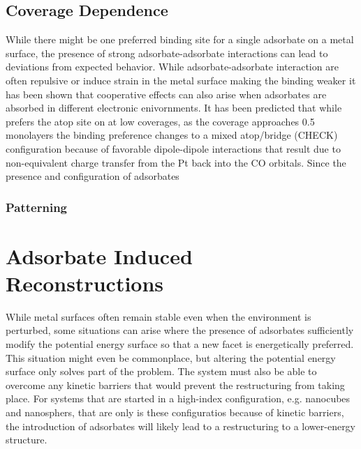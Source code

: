 \subsection{Coverage Dependence}
While there might be one preferred binding site for a single adsorbate on a
metal surface, the presence of strong adsorbate-adsorbate interactions can lead
to deviations from expected behavior. While adsorbate-adsorbate interaction are
often repulsive or induce strain in the metal surface making the binding
weaker\citep{} it has been shown that cooperative effects can also arise when
adsorbates are absorbed in different electronic enivornments. It has been
predicted that while  prefers the atop site on  at low coverages,
as the coverage approaches 0.5 monolayers the binding preference changes to a
mixed atop/bridge (CHECK) configuration because of favorable dipole-dipole
interactions that result due to non-equivalent charge transfer from the Pt back
into the CO orbitals. Since the presence and configuration of adsorbates 


\subsubsection{Patterning}

\section{Adsorbate Induced Reconstructions}

While metal surfaces often remain stable even when the environment is
perturbed, some situations can arise where the presence of adsorbates
sufficiently modify the potential energy surface so that a new facet is
energetically preferred. This situation might even be commonplace, but altering
the potential energy surface only solves part of the problem. The system must
also be able to overcome any kinetic barriers that would prevent the
restructuring from taking place. For systems that are started in a high-index
configuration, e.g. nanocubes and nanosphers, that are only is these
configuratios because of kinetic barriers, the introduction of adsorbates will
likely lead to a restructuring to a lower-energy structure. 

